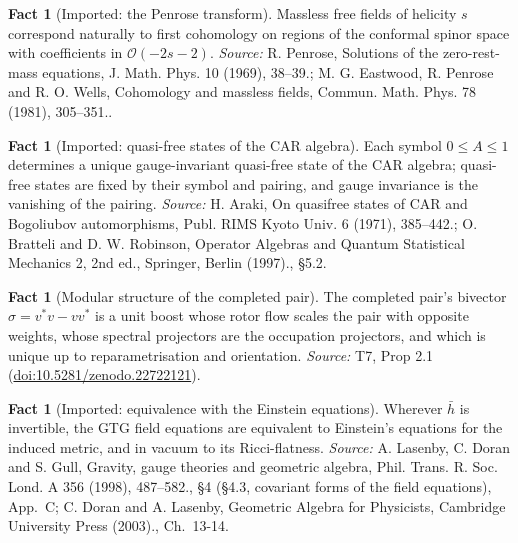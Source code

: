 \documentclass[11pt]{article}
\theoremstyle{definition}
\newtheorem{fact}[theorem]{Fact}
\theoremstyle{plain}
\providecommand{\hb}{}\renewcommand{\hb}{\bar{h}}
\begin{document}
\begin{fact}[Imported: the Penrose transform]\label{c:hawking.imported-penrose-transform}
Massless free fields of helicity $s$ correspond naturally to first cohomology on regions of the conformal spinor space with coefficients in $\mathcal{O}(-2s-2)$.
\emph{Source:} R. Penrose, Solutions of the zero-rest-mass equations, J. Math. Phys. 10 (1969), 38--39.; M. G. Eastwood, R. Penrose and R. O. Wells, Cohomology and massless fields, Commun. Math. Phys. 78 (1981), 305--351..
\end{fact}

\begin{fact}[Imported: quasi-free states of the CAR algebra]\label{c:hawking.imported-quasi-free-states-car-algebra}
Each symbol $0 \le A \le 1$ determines a unique gauge-invariant quasi-free state of the CAR algebra; quasi-free states are fixed by their symbol and pairing, and gauge invariance is the vanishing of the pairing.
\emph{Source:} H. Araki, On quasifree states of CAR and Bogoliubov automorphisms, Publ. RIMS Kyoto Univ. 6 (1971), 385--442.; O. Bratteli and D. W. Robinson, Operator Algebras and Quantum Statistical Mechanics 2, 2nd ed., Springer, Berlin (1997)., \S 5.2.
\end{fact}

\begin{fact}[Modular structure of the completed pair]\label{c:hawking.modular-structure-completed-pair}
The completed pair's bivector $\sigma = v^{*}v - vv^{*}$ is a unit boost whose rotor flow scales the pair with opposite weights, whose spectral projectors are the occupation projectors, and which is unique up to reparametrisation and orientation.
\emph{Source:} T7, Prop 2.1 (\href{https://doi.org/10.5281/zenodo.22722121}{doi:10.5281/zenodo.22722121}).
\end{fact}

\begin{fact}[Imported: equivalence with the Einstein equations]\label{c:interior.imported-equivalence-einstein-equations}
Wherever $\hb$ is invertible, the GTG field equations are equivalent to Einstein's equations for the induced metric, and in vacuum to its Ricci-flatness.
\emph{Source:} A. Lasenby, C. Doran and S. Gull, Gravity, gauge theories and geometric algebra, Phil. Trans. R. Soc. Lond. A 356 (1998), 487--582., \S 4 (\S 4.3, covariant forms of the field equations), App.~C; C. Doran and A. Lasenby, Geometric Algebra for Physicists, Cambridge University Press (2003)., Ch.~13-14.
\end{fact}
\end{document}

